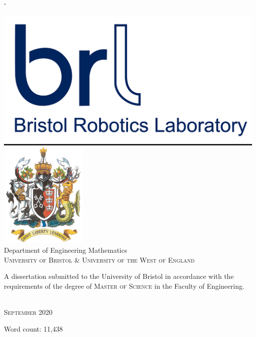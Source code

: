 \begin{titlingpage}
\begin{SingleSpace}
\begin{adjustwidth*}{\unitlength}{-\unitlength}
\begin{center}
\hspace{20mm}
\includegraphics[scale=0.1]{logos/BRL-SNI.png}
\hspace{20mm}
\includegraphics[scale=0.5]{logos/uweCrest.png}\\
\vspace{6mm}
{\large Department of Engineering Mathematics\\
\textsc{University of Bristol \& University of the West of England}}\\
\vspace{11mm}
\begin{minipage}{10cm}
A dissertation submitted to the University of Bristol in accordance with the requirements of the degree of \textsc{Master of Science} in the Faculty of Engineering.
\end{minipage}\\
\vspace{9mm}
{\large\textsc{September 2020}}
\vspace{12mm}
\end{center}
\begin{flushright}
{\small Word count: 11,438}
\end{flushright}
\end{adjustwidth*}
\end{SingleSpace}
\end{titlingpage}